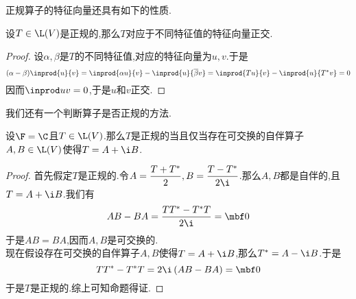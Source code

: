 \documentclass{ctexart}
\begin{document}
正规算子的特征向量还具有如下的性质.
\begin{formal}[3.4 正规算子的特征向量]
    设$T\in\L(V)$是正规的,那么$T$对应于不同特征值的特征向量正交.
\end{formal}
\begin{proof}
    设$\alpha,\beta$是$T$的不同特征值,对应的特征向量为$u,v$.于是
    \[(\alpha-\beta)\inprod{u}{v}=\inprod{\alpha u}{v}-\inprod{u}{\overline{\beta}v}=\inprod{Tu}{v}-\inprod{u}{T^*v}=0\]
    因而$\inprod uv=0$,于是$u$和$v$正交.
\end{proof}\noindent
我们还有一个判断算子是否正规的方法.
\begin{formal}[3.5 正规算子的充要条件II]
    设$\F=\C$且$T\in\L(V)$.那么$T$是正规的当且仅当存在可交换的自伴算子$A,B\in\L(V)$使得$T=A+\i B$.
\end{formal}
\begin{proof}
    首先假定$T$是正规的.令$A=\dfrac{T+T^*}{2},B=\dfrac{T-T^*}{2\i}$.那么$A,B$都是自伴的,且$T=A+\i B$.我们有
    \[AB-BA=\dfrac{TT^*-T^*T}{2\i}=\mbf0\]
    于是$AB=BA$,因而$A,B$是可交换的.\\
    现在假设存在可交换的自伴算子$A,B$使得$T=A+\i B$,那么$T^*=A-\i B$.于是
    \[TT^*-T^*T=2\i\left(AB-BA\right)=\mbf0\]
    于是$T$是正规的.综上可知命题得证.
\end{proof}
\end{document}
